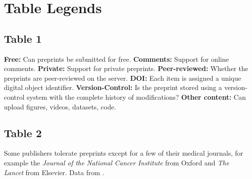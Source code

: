 \documentclass[10pt]{article}
\begin{document}
\newpage
\section*{Table Legends}

\subsection*{Table 1}

\textbf{Free:} Can preprints be submitted for free.
\textbf{Comments:} Support for online comments.
\textbf{Private:} Support for private preprints.
\textbf{Peer-reviewed:} Whether the preprints are peer-reviewed on the server.
\textbf{DOI:} Each item is assigned a unique digital object identifier.
\textbf{Version-Control:} Is the preprint stored using a version-control system with the complete history of modifications?
\textbf{Other content:} Can upload figures, videos, datasets, code.

\subsection*{Table 2}

Some publishers tolerate preprints except for a few of their medical
journals, for example the \emph{ Journal of the National Cancer Institute}
from Oxford and \emph{The Lancet} from Elsevier. Data from \cite{war12}.
\end{document}

